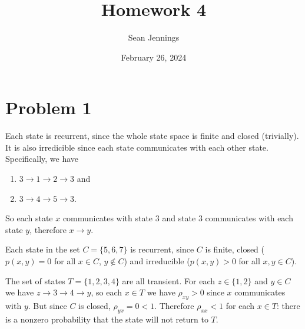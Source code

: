 \documentclass{homework}
\title{Homework 4}
\author{Sean Jennings}
\date{February 26, 2024}
\begin{document}
\maketitle

\section{Problem 1}
\begin{letterenum}
\item Each state is recurrent, since the whole state space is finite and closed
(trivially). It is also irredicible since each state communicates with
each other state. Specifically, we have
\begin{enumerate}
    \item $3\to1\to2\to3$ and 
    \item $3\to4\to5\to3$.
\end{enumerate}
So each state $x$ communicates with state 3 and state 3 communicates with each
state $y$, therefore $x\to y$.

\item Each state in the set $C = \{5, 6, 7\}$ is recurrent, since $C$ is
finite, closed ($p(x, y) = 0$ for all $x\in C$, $y \notin C$) and irreducible 
($p(x, y) > 0$ for all $x,y \in C$).

The set of states $T = \{1, 2, 3, 4\}$ are all transient. For each 
$z \in\{1, 2\}$ and $y\in C$ we have $z\to3\to4\to y$, so each $x \in T$
we have $\rho_{xy} > 0$ since $x$ communicates with $y$. But since $C$
is closed, $\rho_{yx} = 0<1$. Therefore $\rho_{xx} < 1$ for each $x \in T$:
there is a nonzero probability that the state will not return to $T$.
\end{letterenum}
\end{document}
